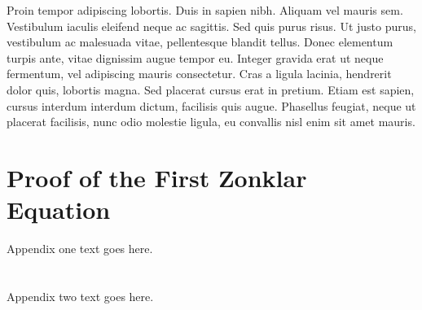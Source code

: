 \documentclass[journal]{IEEEtran}
\begin{document}
Proin tempor adipiscing lobortis. Duis in sapien nibh. Aliquam vel mauris sem. Vestibulum iaculis eleifend neque ac sagittis. Sed quis purus risus. Ut justo purus, vestibulum ac malesuada vitae, pellentesque blandit tellus. Donec elementum turpis ante, vitae dignissim augue tempor eu. Integer gravida erat ut neque fermentum, vel adipiscing mauris consectetur. Cras a ligula lacinia, hendrerit dolor quis, lobortis magna. Sed placerat cursus erat in pretium. Etiam est sapien, cursus interdum interdum dictum, facilisis quis augue. Phasellus feugiat, neque ut placerat facilisis, nunc odio molestie ligula, eu convallis nisl enim sit amet mauris.




%


\appendices
\section{Proof of the First Zonklar Equation}
Appendix one text goes here.

\section{}
Appendix two text goes here.
\end{document}
